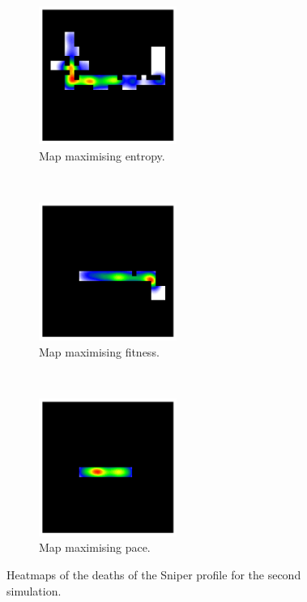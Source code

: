 \begin{figure}[H]
    \centering
    \begin{subfigure}[t]{0.3\textwidth}
        \centering
        \includegraphics[height=4.5cm]{Images/images/experiment_one/best_entropy_pop_1/deaths_bot_1.png}
        \caption{Map maximising entropy.}
    \end{subfigure}%
    ~ 
    \begin{subfigure}[t]{0.3\textwidth}
        \centering
        \includegraphics[height=4.5cm]{Images/images/experiment_one/best_fitness_pop_1/deaths_bot_1.png}
        \caption{Map maximising fitness.}
    \end{subfigure}
    ~ 
    \begin{subfigure}[t]{0.3\textwidth}
        \centering
        \includegraphics[height=4.5cm]{Images/images/experiment_one/best_pace_pop_1/deaths_bot_1.png}
        \caption{Map maximising pace.}
    \end{subfigure}
    \caption{Heatmaps of the deaths of the Sniper profile for the second simulation.}
\end{figure}
